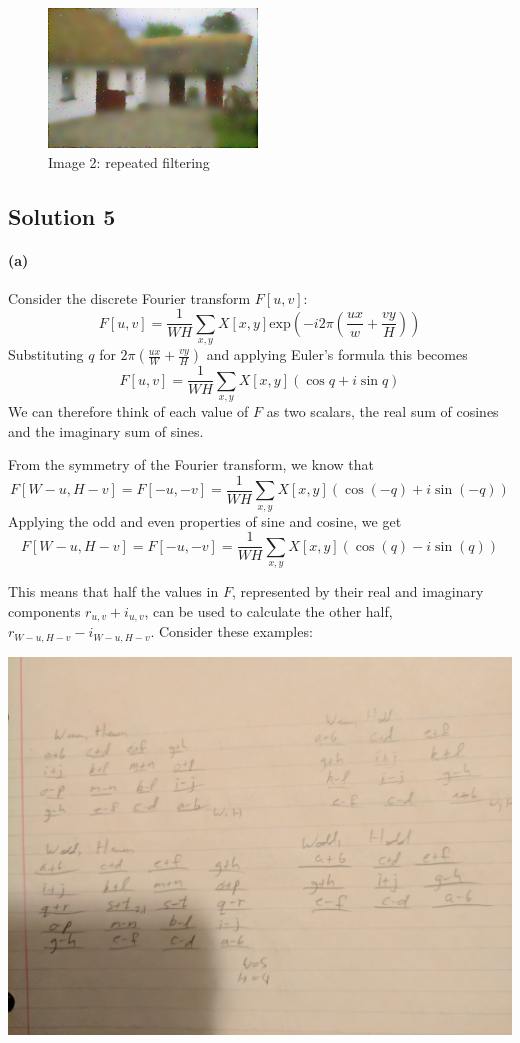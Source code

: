 \documentclass{article}
\newcommand{\solution}[1]{\clearpage \subsection*{Solution #1}}
\newcommand{\spart}[1]{\paragraph{(#1)}}
\begin{document}
\begin{figure}[!h]
  \centering
  \includegraphics[height=10em]{code/outputs/prob4_2_rep.png}
  \caption{Image 2: repeated filtering}
\end{figure}



\solution{5}

\spart{a} Consider the discrete Fourier transform $F[u,v]$:
\begin{equation}
F[u,v] = \frac{1}{WH} \sum_{x,y} X[x,y] \text{exp} \left(-i2\pi \left( \frac{ux}{w} + \frac{vy}{H} \right) \right) 
\end{equation}
Substituting $q$ for $2\pi\left( \frac{ux}{W} + \frac{vy}{H} \right)$ and applying Euler's formula this becomes
\begin{equation}
F[u,v] = \frac{1}{WH} \sum_{x,y} X[x,y]\left( \cos q + i\sin q \right)
\end{equation}
We can therefore think of each value of $F$ as two scalars, the real sum of cosines and the imaginary sum of sines.

 From the symmetry of the Fourier transform, we know that
\begin{equation}
F[W-u, H-v] = F[-u, -v] = \frac{1}{WH} \sum_{x,y} X[x,y]\left( \cos(-q) + i\sin(-q) \right)
\end{equation}
Applying the odd and even properties of sine and cosine, we get
\begin{equation}
F[W-u, H-v] = F[-u, -v] = \frac{1}{WH} \sum_{x,y} X[x,y]\left( \cos(q) - i\sin(q) \right)
\end{equation}

This means that half the values in $F$, represented by their real and imaginary components $r_{u,v} + i_{u,v}$, can be used to calculate the other half, $r_{W-u, H-v} - i_{W-u, H-v}$. Consider these examples:

\includegraphics[width=\textwidth]{prob5_examples.jpg}
\end{document}
